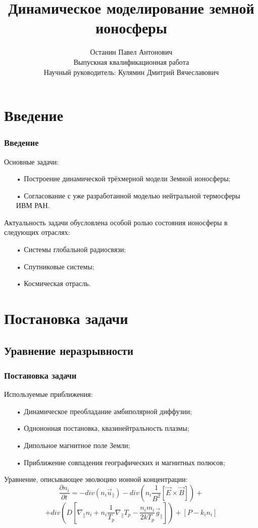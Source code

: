\documentclass[9pt, apectratio=43,unicode]{beamer}
\title[Моделирование земной ионосферы]{Динамическое моделирование земной ионосферы}
\author[Останин П. А.]{Останин Павел Антонович \\ \vspace{1ex} Выпускная квалификационная работа\\ \vspace{1ex} Научный руководитель: Кулямин Дмитрий Вячеславович}
\date{}
\begin{document}
\begin{frame}[plain]
\titlepage
\end{frame}

\def\L{\mathcal{L}}

\section{Введение}
\begin{frame}\frametitle{Введение}
Основные задачи:
\begin{itemize}
\item[•] Построение динамической трёхмерной модели Земной ионосферы;
\item[•] Согласование с уже разработанной моделью нейтральной термосферы ИВМ РАН.
\end{itemize}

Актуальность задачи обусловлена особой ролью состояния ионосферы в следующих отраслях:
\begin{itemize}
\item[•] Системы глобальной радиосвязи;
\item[•] Спутниковые системы;
\item[•] Космическая отрасль.
\end{itemize}

\end{frame}

\section{Постановка задачи}
\subsection{Уравнение неразрывности}
\begin{frame}\frametitle{Постановка задачи}

Используемые приближения:
\begin{itemize}
\item[•] Динамическое преобладание амбиполярной диффузии;
\item[•] Одноионная постановка, квазинейтральность плазмы;
\item[•] Дипольное магнитное поле Земли;
\item[•] Приближение совпадения географических и магнитных полюсов;
\end{itemize}

Уравнение, описывающее эволюцию ионной концентрации: $$\dfrac{\partial n_i}{\partial t} = -div(n_i \vec{u}_\parallel)-div\left(n_i\dfrac{1}{B^2}[\vec{E}\times \vec{B}] \right)+$$ $$+div\left(D\left[\nabla_\parallel n_i +n_i\dfrac{1}{T_p}\nabla_\parallel T_p - \dfrac{n_i m_i}{2kT_p}\vec{g}_\parallel\right]\right)+[P-k_in_i]$$
\end{frame}
\end{document}
